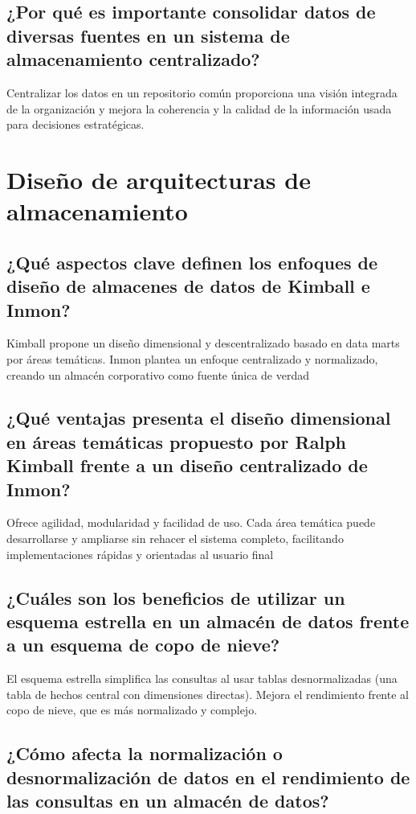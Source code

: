 \documentclass{../../../miPlantilla}
\begin{document}
\subsection{¿Por qué es importante consolidar datos de diversas fuentes en un sistema de almacenamiento centralizado?}

Centralizar los datos en un repositorio común proporciona una visión integrada de la organización y mejora la coherencia y
la calidad de la información usada para decisiones estratégicas.

\newpage

\section{Diseño de arquitecturas de almacenamiento}

\subsection{¿Qué aspectos clave definen los enfoques de diseño de almacenes de datos de Kimball e Inmon?}

Kimball propone un diseño dimensional y descentralizado basado en data marts por áreas temáticas.
Inmon plantea un enfoque centralizado y normalizado, creando un almacén corporativo como fuente única de verdad

\subsection{¿Qué ventajas presenta el diseño dimensional en áreas temáticas propuesto por Ralph Kimball frente a un diseño centralizado de Inmon?}

Ofrece agilidad, modularidad y facilidad de uso. Cada área temática puede desarrollarse y ampliarse sin rehacer el sistema completo, facilitando
implementaciones rápidas y orientadas al usuario final

\subsection{¿Cuáles son los beneficios de utilizar un esquema estrella en un almacén de datos frente a un esquema de copo de nieve?}

El esquema estrella simplifica las consultas al usar tablas desnormalizadas (una tabla de hechos central con dimensiones directas). Mejora el
rendimiento frente al copo de nieve, que es más normalizado y complejo.

\subsection{¿Cómo afecta la normalización o desnormalización de datos en el rendimiento de las consultas en un almacén de datos?}
\end{document}
